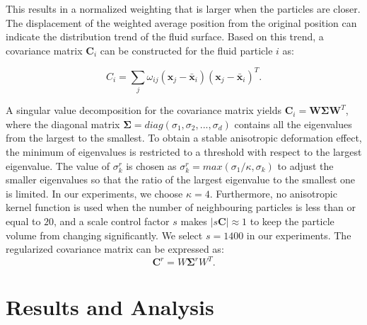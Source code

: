 \documentclass[times,twocolumn,final]{elsarticle}
\begin{document}
This results in a normalized weighting that is larger when the particles are closer. The displacement of the weighted average position from the original position can indicate the distribution trend of the fluid surface. Based on this trend, a covariance matrix $\mathbf{C}_i$ can be constructed for the fluid particle $i$ as:

\begin{equation}
C_{i}=\sum_{j} \omega_{i j}\left(\mathbf{x}_{j}-\bar{\mathbf{x}}_{i}\right)\left(\mathbf{x}_{j}-\bar{\mathbf{x}}_{i}\right)^{T}\label{con:equa12}.
\end{equation}

A singular value decomposition for the covariance matrix yields $\mathbf{C}_{i}=\mathbf{W} \mathbf{\Sigma} \mathbf{W}^{T}$, where the diagonal matrix $\mathbf{\Sigma} = diag(\sigma_1,\sigma_2,...,\sigma_d)$ contains all the eigenvalues from the largest to the smallest. To obtain a stable anisotropic deformation effect, the minimum of eigenvalues is restricted to a threshold with respect to the largest eigenvalue. The value of $\sigma_k^r$ is chosen as $\sigma_k^r=max(\sigma_1/\kappa,\sigma_k)$ to adjust the smaller eigenvalues so that the ratio of the largest eigenvalue to the smallest one is limited. In our experiments, we choose $\kappa=4$. Furthermore, no anisotropic kernel function is used when the number of neighbouring particles is less than or equal to $20$, and a scale control factor $s$ makes $|s \mathbf{C}| \approx 1$ to keep the particle volume from changing significantly. We select $s=1400$ in our experiments. The regularized covariance matrix can be expressed as:
\begin{equation}
\mathbf{C}^{r}=W \mathbf{\Sigma}^{r} W^{T}.
\end{equation}

\section{Results and Analysis}
\end{document}
